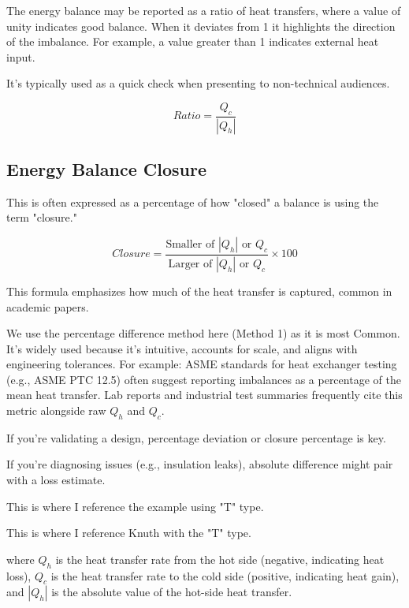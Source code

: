\documentclass[12pt]{article}
\begin{document}
The energy balance may be reported as a ratio of heat transfers, where a value of unity indicates good balance. When it deviates from 1 it highlights the direction of the imbalance. For example, a value greater than 1 indicates external heat input. 

It's typically used as a quick check when presenting to non-technical audiences.

\begin{equation}
	Ratio = \frac{Q_c}{|Q_h|}
\end{equation}


\subsection{Energy Balance Closure}
This is often expressed as a percentage of how "closed" a balance is using the term "closure."

\begin{equation}
	Closure = \frac{\text{Smaller of } |Q_h| \text{ or } Q_c}{\text{Larger of } |Q_h| \text{ or } Q_c} \times 100
\end{equation}

This formula emphasizes how much of the heat transfer is captured, common in academic papers.


We use the percentage difference method here (Method 1) as it is most Common. It's widely used because it’s intuitive, accounts for scale, and aligns with engineering tolerances. For example: ASME standards for heat exchanger testing (e.g., ASME PTC 12.5) often suggest reporting imbalances as a percentage of the mean heat transfer. Lab reports and industrial test summaries frequently cite this metric alongside raw $Q_h$ and $Q_c$.


If you’re validating a design, percentage deviation or closure percentage is key.

If you’re diagnosing issues (e.g., insulation leaks), absolute difference might pair with a loss estimate.


This is where I reference the example using "T" type.\cite{example2023}


This is where I reference Knuth with the "T" type.\cite{knuth1997}





where \( Q_h \) is the heat transfer rate from the hot side (negative, indicating heat loss), \( Q_c \) is the heat transfer rate to the cold side (positive, indicating heat gain), and \( |Q_h| \) is the absolute value of the hot-side heat transfer.
\end{document}
